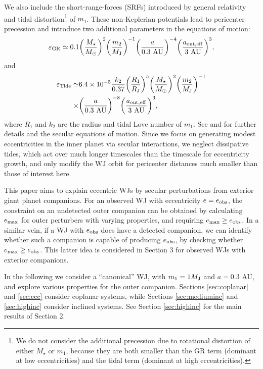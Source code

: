 \documentclass[12pt,useAMS, usenatbib]{mn2e}
\newcommand{\be}{\begin{equation}}
\newcommand{\ee}{\end{equation}}
\newcommand{\Max}{{\rm max}}
\newcommand{\emax}{e_\Max}
\newcommand{\eobs}{e_{\rm obs}}
\newcommand{\tide}{\rm Tide}
\newcommand{\aouteff}{a_{\rm out,eff}}
\newcommand{\gr}{\rm GR}
\newcommand{\mjup}{M_{\rm J}}
\newcommand{\msun}{M_{\odot}}
\newcommand{\rjup}{R_{\rm J}}
\begin{document}
We also include the short-range-forces (SRFs) introduced by general relativity and tidal distortion\footnote{We do not consider the additional precession due to rotational distortion of either $M_\star$ or $m_1$, because they are both smaller than the GR term (dominant at low eccentricities) and the tidal term (dominant at high eccentricities).} of $m_1$.  These non-Keplerian potentials lead to pericenter precession and introduce two additional parameters in the equations of motion:
\be
\varepsilon_{\gr} \simeq 0.1 \bigg( \frac{M_\star}{\msun} \bigg)^{2} \bigg( \frac{m_2}{\mjup} \bigg)^{-1} \bigg( \frac{a}{0.3 \ {\rm AU}} \bigg)^{-4} \bigg( \frac{\aouteff}{3 \ {\rm AU}} \bigg)^{3},
\label{eq:epsGR}
\ee
and
\be
\begin{split}
\varepsilon_{\tide}  \simeq & 6.4 \times 10^{-5} \frac{k_{2}}{0.37} \bigg(\frac{R_{1}}{\rjup} \bigg)^5 \bigg( \frac{M_\star}{\msun} \bigg)^{2} \bigg( \frac{m_2}{\mjup} \bigg)^{-1} \\
 \times & \bigg( \frac{a}{0.3 \ {\rm AU}} \bigg)^{-8} \bigg( \frac{\aouteff}{3 \ {\rm AU}} \bigg)^{3},
\end{split}
\label{eq:epsTide}
\ee
where $R_1$ and $k_{2}$ are the radius and tidal Love number of $m_1$.
See \cite{kra2016} and \cite{liu2015} for further details and the secular equations of motion.  Since we focus on generating
modest eccentricities in the inner planet via secular interactions, we neglect dissipative tides, which act over much longer timescales than the timescale for eccentricity growth, and only modify the WJ orbit for pericenter distances much smaller than those of interest here.

This paper aims to explain eccentric WJs by secular perturbations from exterior giant planet companions. For an observed WJ with eccentricity $e = \eobs$, the constraint on an undetected outer companion can be obtained by calculating $\emax$ for outer perturbers with varying properties, and requiring $\emax \geq \eobs$. In a similar vein, if a WJ with $\eobs$ does have a detected companion, we can identify whether such a companion is capable of producing $\eobs$, by checking whether $\emax \geq \eobs$.  This latter idea is considered in Section 3 for observed WJs with exterior companions.

In the following we consider a  ``canonical'' WJ, with $m_1 = 1 \mjup$ and $a = 0.3$ AU, and explore various properties for the outer companion.  Sections \ref{sec:coplanar} and \ref{sec:ecc} consider coplanar systems, while Sections \ref{sec:mediuminc} and \ref{sec:highinc} consider inclined systems.  See Section \ref{sec:highinc} for the main results of Section 2.
\end{document}
